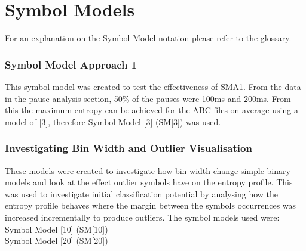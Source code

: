 \afterpage{\clearpage}

\section{Symbol Models}
For an explanation on the Symbol Model notation please refer to the glossary.

\subsubsection{Symbol Model Approach 1} 
This symbol model was created to test the effectiveness of SMA1. 
From the data in the pause analysis section, 50\% of the pauses were 100ms and 200ms.
From this the maximum entropy can be achieved for the ABC files on average using a model of [3], therefore
Symbol Model [3] (SM[3]) was used. 

\subsubsection{Investigating Bin Width and Outlier Visualisation}
These models were created to investigate how bin width change simple binary models and look at the effect outlier symbols have on the entropy profile. This was used to investigate initial classification potential by analysing how the entropy profile behaves where the margin between the symbols occurrences was increased incrementally to produce outliers. 
The symbol models used were: \\
Symbol Model [10] (SM[10]) \\
Symbol Model [20] (SM[20]) 
%

